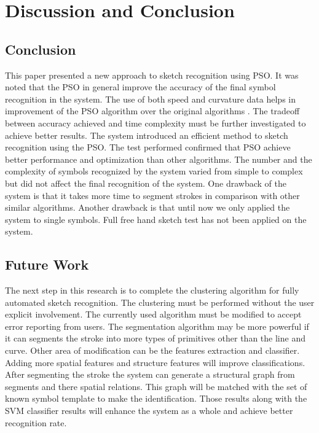 \chapter{Discussion and Conclusion}
\label{sec:DiscussionConclusion}

\section{Conclusion}
\label{sec:ConclusionConclusion}

This paper presented a new approach to sketch recognition using PSO. It was noted that the PSO in general improve the accuracy of the final symbol recognition in the system. The use of both speed and curvature data helps in improvement of the PSO algorithm over the original algorithms \cite{CruveDivisionSwarm,PolygonApproximationPSO}. The tradeoff between accuracy achieved and time complexity must be further investigated to achieve better results.  The system introduced an efficient method to sketch recognition using the PSO. The test performed confirmed that PSO achieve better performance and optimization than other algorithms. The number and the complexity of symbols recognized by the system varied from simple to complex but did not affect the final recognition of the system. One drawback of the system is that it takes more time to segment strokes in comparison with other similar algorithms.  Another drawback is that until now we only applied the system to single symbols.  Full free hand sketch test has not been applied on the system. %


\newpage

\section{Future Work}
\label{sec:FutureWork}


The next step in this research is to complete the clustering algorithm for fully automated sketch recognition. The clustering must be performed without the user explicit involvement.  The currently used algorithm must be modified to accept error reporting from users. The segmentation algorithm may be more powerful if it can segments the stroke into more types of primitives other than the line and curve. Other area of modification can be the features extraction and classifier. Adding more spatial features and structure features will improve classifications. After segmenting the stroke the system can generate a structural graph from segments and there spatial relations. This graph will be matched with the set of known symbol template to make the identification. Those results along with the SVM classifier results will enhance the system as a whole and achieve better recognition rate.  %
